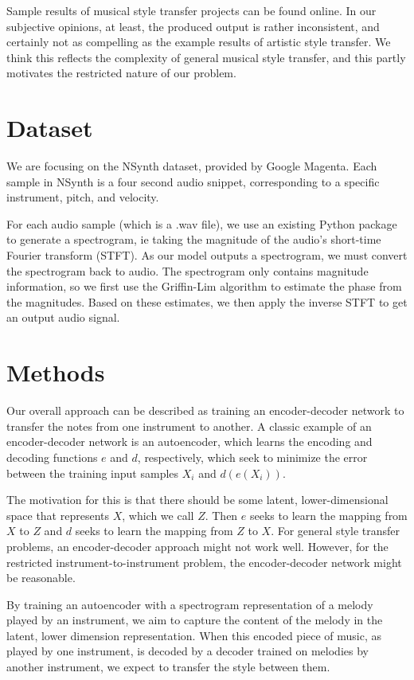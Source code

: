 \documentclass{article}
\begin{document}
Sample results of musical style transfer projects can be found online.  In our subjective opinions, at least, the produced output is rather inconsistent, and certainly not as compelling as the example results of artistic style transfer.
We think this reflects the complexity of general musical style transfer, and this partly motivates the restricted nature of our problem.

\section{Dataset}

We are focusing on the NSynth dataset\cite{nsynth2017}, provided by Google Magenta.
Each sample in NSynth is a four second audio snippet, corresponding to a specific instrument, pitch, and velocity.

For each audio sample (which is a .wav file), we use an existing Python package to generate a spectrogram, ie taking the magnitude of the audio's short-time Fourier transform (STFT). 
As our model outputs a spectrogram, we must convert the spectrogram back to audio.
The spectrogram only contains magnitude information,
so we first use the Griffin-Lim algorithm to estimate the phase from the magnitudes.
Based on these estimates, we then apply the inverse STFT to get an output audio signal.

\section{Methods}

Our overall approach can be described as training an encoder-decoder network to transfer the notes from one instrument to another.
A classic example of an encoder-decoder network is an autoencoder, which learns the encoding and decoding functions $e$ and $d$, respectively, which seek to minimize the error between the training input samples $X_i$ and $d(e(X_i))$.

The motivation for this is that there should be some latent, lower-dimensional space that represents $X$, which we call $Z$. Then $e$ seeks to learn the mapping from $X$ to $Z$ and $d$ seeks to learn the mapping from $Z$ to $X$. For general style transfer problems, an encoder-decoder approach might not work well. However, for the restricted instrument-to-instrument problem, the encoder-decoder network might be reasonable.

By training an autoencoder with a spectrogram representation of a melody played by an instrument, we aim to capture the content of the melody in the latent, lower dimension representation. When this encoded piece of music, as played by one instrument, is decoded by a decoder trained on melodies by another instrument, we expect to transfer the style between them. 
\end{document}
